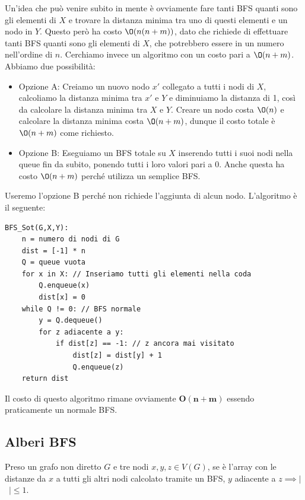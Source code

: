 \documentclass[11pt, a4paper, titlepage, oneside]{scrbook}
\begin{document}
Un'idea che può venire subito in mente è ovviamente fare tanti BFS quanti sono gli elementi di $X$ e trovare la distanza minima tra uno di questi elementi e un nodo in $Y$. Questo però ha costo $\O(n(n+m))$, dato che richiede di effettuare tanti BFS quanti sono gli elementi di $X$, che potrebbero essere in un numero nell'ordine di $n$. Cerchiamo invece un algoritmo con un costo pari a $\O(n+m)$. Abbiamo due possibilità:
\begin{itemize}
    \item Opzione A: Creiamo un nuovo nodo $x'$ collegato a tutti i nodi di $X$, calcoliamo la distanza minima tra $x'$ e $Y$ e diminuiamo la distanza di 1, così da calcolare la distanza minima tra $X$ e $Y$. Creare un nodo costa $\O(n)$ e calcolare la distanza minima costa $\O(n+m)$, dunque il costo totale è $\O(n+m)$ come richiesto.
    \item Opzione B: Eseguiamo un BFS totale su $X$ inserendo tutti i suoi nodi nella queue fin da subito, ponendo tutti i loro valori  pari a 0. Anche questa ha costo $\O(n+m)$ perché utilizza un semplice BFS.
\end{itemize}

Useremo l'opzione B perché non richiede l'aggiunta di alcun nodo. L'algoritmo è il seguente:
\begin{lstlisting}
BFS_Sot(G,X,Y):
    n = numero di nodi di G
    dist = [-1] * n
    Q = queue vuota
    for x in X: // Inseriamo tutti gli elementi nella coda
        Q.enqueue(x)
        dist[x] = 0
    while Q != 0: // BFS normale
        y = Q.dequeue()
        for z adiacente a y:
            if dist[z] == -1: // z ancora mai visitato
                dist[z] = dist[y] + 1
                Q.enqueue(z)
    return dist
\end{lstlisting}

Il costo di questo algoritmo rimane ovviamente $\textbf{O}\bm{(n+m)}$ essendo praticamente un normale BFS.

\subsection{Alberi BFS}

\begin{Proposizione}[]
\label{propos-distanza-modulo}
Preso un grafo non diretto $G$ e tre nodi $x,y,z \in V(G)$, se  è l'array con le distanze da $x$ a tutti gli altri nodi calcolato tramite un BFS, $y$ adiacente a \mbox{$z \implies \bm{|}$  $\bm{|} \leq 1$}.  
\end{Proposizione}
\end{document}
